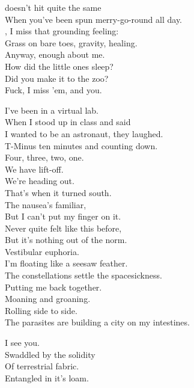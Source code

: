  doesn't hit quite the same \\
When you've been spun merry-go-round all day. \\
, I miss that grounding feeling: \\
Grass on bare toes, gravity, healing. \\
Anyway, enough about me. \\
How did the little ones sleep? \\
Did you make it to the zoo? \\
Fuck, I miss 'em, and you. \\


I've been  in a virtual lab. \\
When I stood up in class and said \\
I wanted to be an astronaut, they laughed. \\
T-Minus ten minutes and counting down. \\
Four, three, two, one. \\
We have lift-off. \\
We're heading out. \\
That's when it turned south. \\

The nausea's familiar, \\
But I can't put my finger on it. \\
Never quite felt like this before, \\
But it's nothing out of the norm. \\
Vestibular euphoria. \\
I'm floating like a seesaw feather. \\
The constellations settle the spacesickness. \\
Putting me back together. \\

Moaning and groaning. \\
Rolling side to side. \\
The parasites are building a city on my intestines. \\


I see you. \\
Swaddled by the solidity \\
Of terrestrial fabric. \\
Entangled in it's loam. \\

